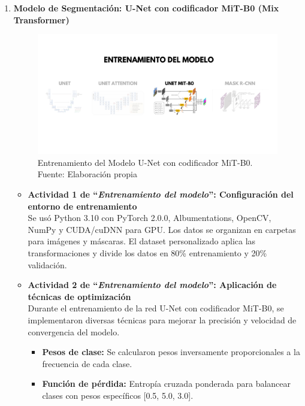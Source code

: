\begin{enumerate}
\begin{itemize}
  \end{itemize}
\newpage
  \item \textbf{Modelo de Segmentación: U-Net con codificador MiT-B0 (Mix Transformer)}
  \begin{figure}[H]
	\begin{center}
		\includegraphics[width=1\textwidth]{4/figures/entrunetmit.png}
		\caption[Entrenamiento del Modelo U-Net con codificador MiT-B0]{Entrenamiento del Modelo U-Net con codificador MiT-B0.\\
		Fuente: Elaboración propia}
		\label{4:figentunetmit}
	\end{center}
\end{figure}
  \begin{itemize}
  \item\textbf{Actividad 1 de “\textit{Entrenamiento del modelo}”: Configuración del entorno de entrenamiento}
\\  
  Se usó Python 3.10 con PyTorch 2.0.0, Albumentations, OpenCV, NumPy y CUDA/cuDNN para GPU. Los datos se organizan en carpetas para imágenes y máscaras. El dataset personalizado aplica las transformaciones y divide los datos en 80\% entrenamiento y 20\% validación.


  \item\textbf{Actividad 2 de “\textit{Entrenamiento del modelo}”: Aplicación de técnicas de optimización}
\\   
  Durante el entrenamiento de la red U-Net con codificador MiT-B0, se implementaron diversas técnicas para mejorar la precisión y velocidad de convergencia del modelo.

\begin{itemize}
\item \textbf{Pesos de clase:} Se calcularon pesos inversamente proporcionales a la frecuencia de cada clase.

\item \textbf{Función de pérdida:} Entropía cruzada ponderada para balancear clases con pesos específicos [0.5, 5.0, 3.0].


\end{itemize}
\end{itemize}
\end{enumerate}
